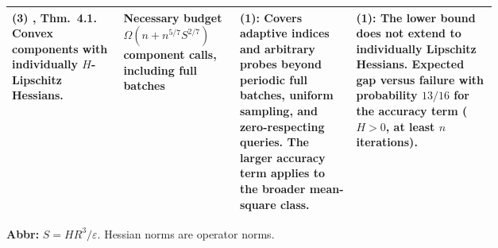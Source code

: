 \begin{table}[tp]
\begin{threeparttable}
\begin{tabularx}{\linewidth}{@{}>{\raggedright\arraybackslash}p{0.23\linewidth}>{\raggedright\arraybackslash}p{0.24\linewidth}>{\raggedright\arraybackslash}p{0.24\linewidth}>{\raggedright\arraybackslash}X@{}}
\midrule
\textbf{(3)} \citep{fstZhang2026v1}, Thm.~4.1. Convex components with individually $H$-Lipschitz Hessians.
& Necessary budget $\Omega(n+n^{5/7}S^{2/7})$ component calls, including full batches
& \textbf{(1)}: Covers adaptive indices and arbitrary probes beyond periodic full batches, uniform sampling, and zero-respecting queries. The larger accuracy term applies to the broader mean-square class.
& \textbf{(1)}: The lower bound does not extend to individually Lipschitz Hessians. Expected gap versus failure with probability $13/16$ for the accuracy term ($H>0$, at least $n$ iterations). \\
\bottomrule
\end{tabularx}
\begin{tablenotes}[flushleft]\footnotesize
\item[] \textbf{Abbr:} $S=HR^3/\varepsilon$. Hessian norms are operator norms.
\end{tablenotes}
\end{threeparttable}
\end{table}
